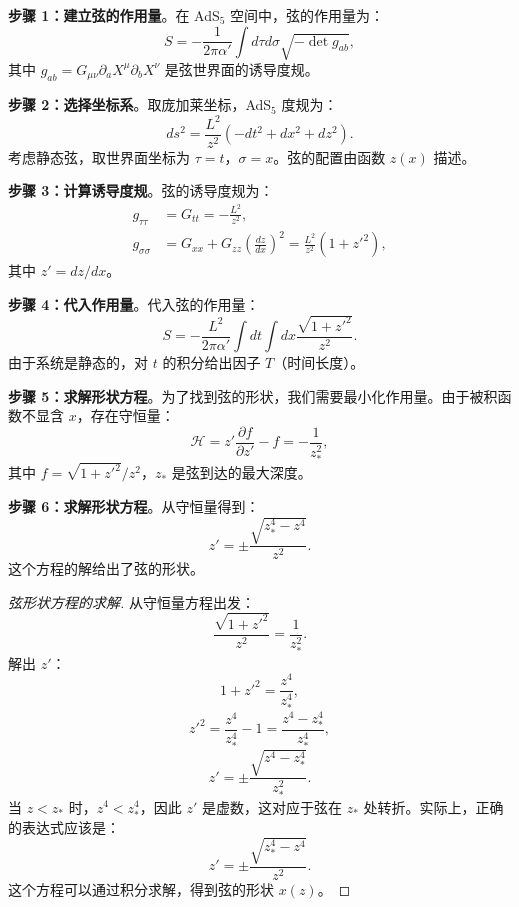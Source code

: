 \textbf{步骤 1：建立弦的作用量}。在 AdS$_5$ 空间中，弦的作用量为：
\begin{equation}
    S = -\frac{1}{2\pi \alpha'} \int d\tau d\sigma \sqrt{-\det g_{ab}},
\end{equation}
其中 $g_{ab} = G_{\mu\nu} \partial_a X^\mu \partial_b X^\nu$ 是弦世界面的诱导度规。

\textbf{步骤 2：选择坐标系}。取庞加莱坐标，AdS$_5$ 度规为：
\begin{equation}
    ds^2 = \frac{L^2}{z^2} (-dt^2 + dx^2 + dz^2).
\end{equation}
考虑静态弦，取世界面坐标为 $\tau = t$，$\sigma = x$。弦的配置由函数 $z(x)$ 描述。

\textbf{步骤 3：计算诱导度规}。弦的诱导度规为：
\begin{align}
    g_{\tau\tau} &= G_{tt} = -\frac{L^2}{z^2}, \\
    g_{\sigma\sigma} &= G_{xx} + G_{zz} \left(\frac{dz}{dx}\right)^2 = \frac{L^2}{z^2} (1 + z'^2),
\end{align}
其中 $z' = dz/dx$。

\textbf{步骤 4：代入作用量}。代入弦的作用量：
\begin{equation}
    S = -\frac{L^2}{2\pi \alpha'} \int dt \int dx \frac{\sqrt{1 + z'^2}}{z^2}.
\end{equation}
由于系统是静态的，对 $t$ 的积分给出因子 $T$（时间长度）。

\textbf{步骤 5：求解形状方程}。为了找到弦的形状，我们需要最小化作用量。由于被积函数不显含 $x$，存在守恒量：
\begin{equation}
    \mathcal{H} = z' \frac{\partial f}{\partial z'} - f = -\frac{1}{z_*^2},
\end{equation}
其中 $f = \sqrt{1 + z'^2}/z^2$，$z_*$ 是弦到达的最大深度。

\textbf{步骤 6：求解形状方程}。从守恒量得到：
\begin{equation}
    z' = \pm \frac{\sqrt{z_*^4 - z^4}}{z^2}.
\end{equation}
这个方程的解给出了弦的形状。

\begin{proof}[弦形状方程的求解]
从守恒量方程出发：
\begin{equation}
    \frac{\sqrt{1 + z'^2}}{z^2} = \frac{1}{z_*^2}.
\end{equation}
解出 $z'$：
\begin{equation}
    1 + z'^2 = \frac{z^4}{z_*^4},
\end{equation}
\begin{equation}
    z'^2 = \frac{z^4}{z_*^4} - 1 = \frac{z^4 - z_*^4}{z_*^4},
\end{equation}
\begin{equation}
    z' = \pm \frac{\sqrt{z^4 - z_*^4}}{z_*^2}.
\end{equation}
当 $z < z_*$ 时，$z^4 < z_*^4$，因此 $z'$ 是虚数，这对应于弦在 $z_*$ 处转折。实际上，正确的表达式应该是：
\begin{equation}
    z' = \pm \frac{\sqrt{z_*^4 - z^4}}{z^2}.
\end{equation}
这个方程可以通过积分求解，得到弦的形状 $x(z)$。
\end{proof}

